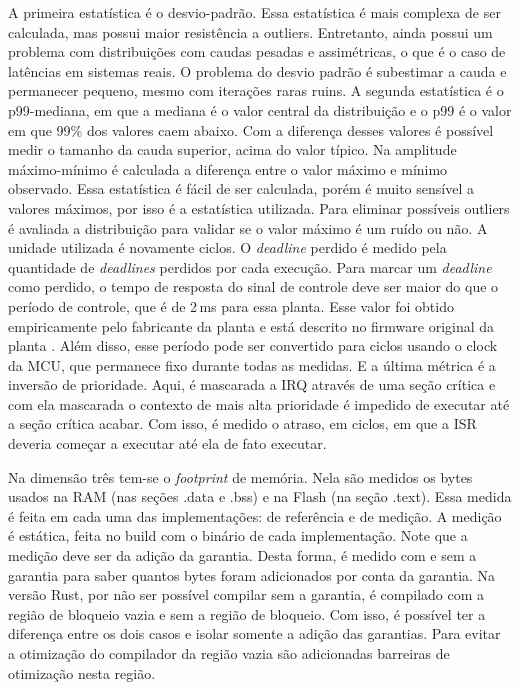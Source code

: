 A primeira estatística é o desvio-padrão. Essa estatística é mais complexa de ser calculada, mas possui maior resistência a outliers. Entretanto, ainda possui um problema com distribuições com caudas pesadas e assimétricas, o que é o caso de latências em sistemas reais. O problema do desvio padrão é subestimar a cauda e permanecer pequeno, mesmo com iterações raras ruins. A segunda estatística é o p99-mediana, em que a mediana é o valor central da distribuição e o p99 é o valor em que 99\% dos valores caem abaixo. Com a diferença desses valores é possível medir o tamanho da cauda superior, acima do valor típico. Na amplitude máximo-mínimo é calculada a diferença entre o valor máximo e mínimo observado. Essa estatística é fácil de ser calculada, porém é muito sensível a valores máximos, por isso é a estatística utilizada. Para eliminar possíveis outliers é avaliada a distribuição para validar se o valor máximo é um ruído ou não. A unidade utilizada é novamente ciclos. O \textit{deadline} perdido é medido pela quantidade de \textit{deadlines} perdidos por cada execução. Para marcar um \textit{deadline} como perdido, o tempo de resposta do sinal de controle deve ser maior do que o período de controle, que é de 2\,ms para essa planta. Esse valor foi obtido empiricamente pelo fabricante da planta e está descrito no firmware original da planta \citep{furuta-plant}. Além disso, esse período pode ser convertido para ciclos usando o clock da \ac{MCU}, que permanece fixo durante todas as medidas. E a última métrica é a inversão de prioridade. Aqui, é mascarada a \ac{IRQ} através de uma seção crítica e com ela mascarada o contexto de mais alta prioridade é impedido de executar até a seção crítica acabar. Com isso, é medido o atraso, em ciclos, em que a \ac{ISR} deveria começar a executar até ela de fato executar.

Na dimensão três tem-se o \textit{footprint} de memória. Nela são medidos os bytes usados na \ac{RAM} (nas seções .data e .bss) e na Flash (na seção .text). Essa medida é feita em cada uma das implementações: de referência e de medição. A medição é estática, feita no build com o binário de cada implementação. Note que a medição deve ser da adição da garantia. Desta forma, é medido com e sem a garantia para saber quantos bytes foram adicionados por conta da garantia. Na versão Rust, por não ser possível compilar sem a garantia, é compilado com a região de bloqueio vazia e sem a região de bloqueio. Com isso, é possível ter a diferença entre os dois casos e isolar somente a adição das garantias. Para evitar a otimização do compilador da região vazia são adicionadas barreiras de otimização nesta região.

